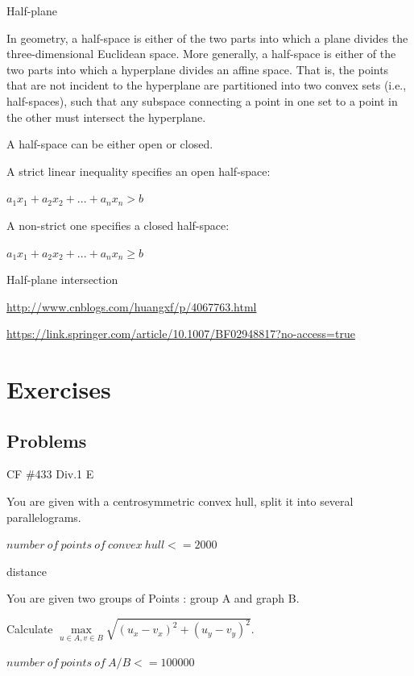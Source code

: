 \documentclass[UTF8]{beamer}
\begin{document}
	\begin{frame}{Half-plane}

	In geometry, a half-space is either of the two parts into which a plane divides the three-dimensional Euclidean space. More generally, a half-space is either of the two parts into which a hyperplane divides an affine space. That is, the points that are not incident to the hyperplane are partitioned into two convex sets (i.e., half-spaces), such that any subspace connecting a point in one set to a point in the other must intersect the hyperplane.

	A half-space can be either open or closed.

	A strict linear inequality specifies an open half-space:

	$a_1x_1 + a_2x_2 + ... + a_nx_n > b$

	A non-strict one specifies a closed half-space:

	$a_1x_1 + a_2x_2 + ... + a_nx_n \ge b$

	\end{frame}

	\begin{frame}{Half-plane intersection}

	\url{http://www.cnblogs.com/huangxf/p/4067763.html}

	\url{https://link.springer.com/article/10.1007/BF02948817?no-access=true}

	\end{frame}

	\section{Exercises}

	\subsection{Problems}

	\begin{frame}{CF \#433 Div.1 E}

	You are given with a centrosymmetric convex hull, split it into several parallelograms.

	$number\ of\ points\ of\ convex\ hull<=2000$

	\end{frame}

	\begin{frame}{distance}

	You are given two groups of Points : group A and graph B.

	Calculate $\max \limits_{u \in A, v \in B} \sqrt{(u_x - v_x)^2 + (u_y - v_y)^2}$.

	$number\ of\ points\ of\ A/B<=100000$

	\end{frame}
\end{document}
